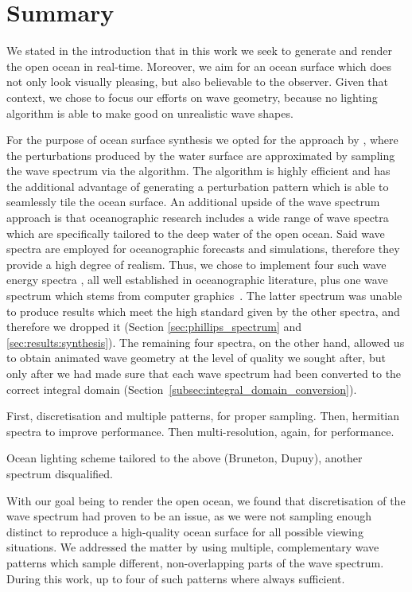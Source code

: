 \chapter{Summary}
\label{ch:summary}

We stated in the introduction that in this work we seek to generate and render the
open ocean in real-time. Moreover, we aim for an ocean surface which does not only
look visually pleasing, but also believable to the observer. Given that context,
we chose to focus our efforts on wave geometry, because no lighting algorithm
is able to make good on unrealistic wave shapes.

For the purpose of ocean surface synthesis we opted for the approach by
\citet{course:simulatingocean}, where the perturbations produced
by the water surface are approximated by sampling the wave spectrum via
the \FastFourierTransform algorithm. The \FFT algorithm is highly
efficient and has the additional advantage of generating a perturbation
pattern which is able to seamlessly tile the ocean surface.
An additional upside of the wave spectrum approach is that oceanographic
research includes a wide range of wave spectra which are specifically
tailored to the deep water of the open ocean. Said wave spectra are
employed for oceanographic forecasts and simulations, therefore they
provide a high degree of realism.
Thus, we chose to implement four such wave energy spectra
\citep{article:PiersonMoskowitz1964, article:Hasselman1973, article:Donelan1985, article:Elfouhaily1997},
all well established in oceanographic literature, plus one wave
spectrum which stems from computer graphics~\citep{course:simulatingocean}.
The latter spectrum was unable to produce results which meet the high
standard given by the other spectra, and therefore we dropped it
(Section \ref{sec:phillips_spectrum} and \ref{sec:results:synthesis}).
The remaining four spectra, on the other hand, allowed us to obtain
animated wave geometry at the level of quality we sought after,
but only after we had made sure that each wave spectrum had been converted
to the correct integral domain (Section~\ref{subsec:integral_domain_conversion}).
%

First, discretisation and multiple patterns, for proper sampling. Then,
hermitian spectra to improve performance. Then multi-resolution, again,
for performance.

Ocean lighting scheme tailored to the above (Bruneton, Dupuy), another spectrum
disqualified.

With our goal being to render the open ocean, we found that discretisation
of the wave spectrum had proven to be an issue, as we were not sampling enough
distinct \wavenumbers to reproduce a high-quality ocean surface for all
possible viewing situations. We addressed the matter by using multiple,
complementary wave patterns which sample different, non-overlapping parts
of the wave spectrum. During this work, up to four of such patterns where
always sufficient.

